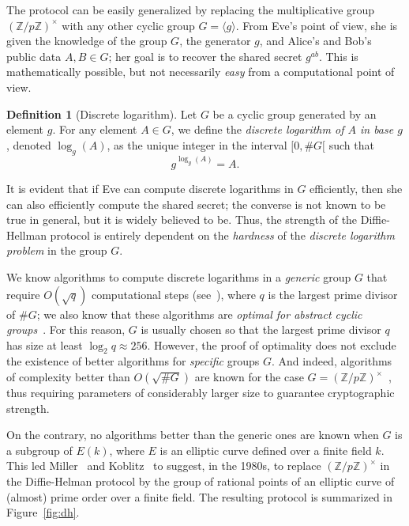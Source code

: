 \documentclass[10pt]{article}
\theoremstyle{plain}
\theoremstyle{definition}
\newtheorem{definition}[theorem]{Definition}
\begin{document}
The protocol can be easily generalized by replacing the multiplicative
group $(ℤ/pℤ)^{×}$ with any other cyclic group $G=〈g〉$. %
From Eve's point of view, she is given the knowledge of the group $G$,
the generator $g$, and Alice's and Bob's public data $A,B∈G$; her goal
is to recover the shared secret $g^{ab}$. %
This is mathematically possible, but not necessarily \emph{easy} from
a computational point of view.

\begin{definition}[Discrete logarithm]
  Let $G$ be a cyclic group generated by an element $g$. For any
  element $A∈G$, we define the \emph{discrete logarithm of $A$ in base
    $g$}, denoted $\log_g(A)$, as the unique integer in the interval
  $[0,\#G[$ such that
  \[g^{\log_g(A)} = A.\]
\end{definition}

It is evident that if Eve can compute discrete logarithms in $G$
efficiently, then she can also efficiently compute the shared secret;
the converse is not known to be true in general, but it is widely
believed to be. %
Thus, the strength of the Diffie-Hellman protocol is entirely
dependent on the \emph{hardness} of the \emph{discrete logarithm
  problem} in the group $G$.

We know algorithms to compute discrete logarithms in a \emph{generic}
group $G$ that require $O(\sqrt{q})$ computational steps
(see~\cite{joux2009algorithmic}), where $q$ is the largest prime
divisor of $\#G$; we also know that these algorithms are \emph{optimal
  for abstract cyclic groups}~\cite{EC:Shoup97}. %
For this reason, $G$ is usually chosen so that the largest prime
divisor $q$ has size at least $\log_2 q ≈ 256$. %
However, the proof of optimality does not exclude the existence of
better algorithms for \emph{specific} groups $G$. %
And indeed, algorithms of complexity better than $O(\sqrt{\#G})$ are
known for the case $G=(ℤ/pℤ)^{×}$~\cite{joux2009algorithmic}, thus
requiring parameters of considerably larger size to guarantee
cryptographic strength.

On the contrary, no algorithms better than the generic ones are known
when $G$ is a subgroup of $E(k)$, where $E$ is an elliptic curve
defined over a finite field $k$. %
This led Miller~\cite{C:Miller85} and
Koblitz~\cite{koblitz87,JC:Koblitz89} to suggest, in the 1980s, to
replace $(ℤ/pℤ)^{×}$ in the Diffie-Helman protocol by the group of
rational points of an elliptic curve of (almost) prime order over a
finite field. %
The resulting protocol is summarized in Figure~\ref{fig:dh}.
\end{document}

